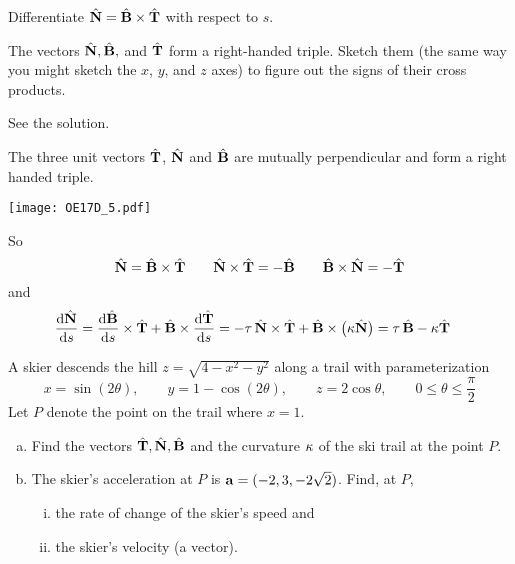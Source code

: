 \begin{hint} 
Differentiate $\hat{\mathbf{N}} =\hat{\mathbf{B}}\times\hat{\mathbf{T}}$ with respect to $s$. 

The vectors $\hat{\mathbf{N}}, \hat{\mathbf{B}},$ and $\hat{\mathbf{T}}$ form a right-handed triple. Sketch them (the same way you might sketch the $x$, $y$, and $z$ axes) to figure out the signs of their cross products.
\end{hint}

\begin{answer} 
See the solution.
\end{answer}

\begin{solution} 
The three unit vectors $\hat{\mathbf{T}}$, $\hat{\mathbf{N}}$ and $\hat{\mathbf{B}}$ are 
mutually perpendicular and form a right handed triple.
\begin{center}
     \texttt{[image: OE17D\_5.pdf]}
\end{center}
So
\begin{equation*}
\hat{\mathbf{N}} = \hat{\mathbf{B}}\times\hat{\mathbf{T}} \qquad
\hat{\mathbf{N}}\times\hat{\mathbf{T}} = -\hat{\mathbf{B}} \qquad
\hat{\mathbf{B}}\times\hat{\mathbf{N}} = -\hat{\mathbf{T}}
\end{equation*}
and
\begin{align*}
\diff{\hat\vN}{s} & = \diff{\hat\vB}{s}\times\hat\vT
                     +\hat\vB\times \diff{\hat\vT}{s}
= -\tau\,\hat\vN\times\hat\vT
                     +\hat\vB\times\big(\ka\hat\vN\big)
= \tau\,\hat\vB - \ka\hat\vT
\end{align*}
\end{solution}


\begin{question}[M317 2000D] %
 A skier descends the hill $z =\sqrt{4-x^2-y^2}$ along a trail with 
parameterization
$$
x=\sin(2\theta),\qquad y=1-\cos(2\theta),\qquad z=2\cos\theta,\qquad
 0\le\theta\le\frac{\pi}{2}
$$
   Let $P$ denote the point on the trail where $x = 1$.
\begin{enumerate}[(a)]
\item
   Find the vectors $\hat{\mathbf{T}}, \hat{\mathbf{N}}, \hat{\mathbf{B}}$ and 
   the curvature $\kappa$ of the ski trail at the point $P$.
                                                         
\item
The skier's acceleration at $P$ is $\mathbf{a} = (-2, 3, -2\sqrt{2})$.
           Find, at $P$,
\begin{enumerate}[(i)]
\item
the rate of change of the skier's speed and
\item
the skier's velocity (a vector).
\end{enumerate}
\end{enumerate}

\end{question}

